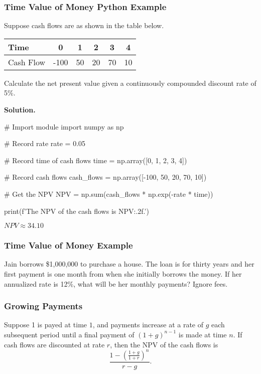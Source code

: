 \documentclass{beamer}
\begin{document}
\begin{frame}[fragile]
\frametitle{Time Value of Money Python Example}
\small
\begin{Example}
Suppose cash flows are as shown in the table below.
\begin{center}
\begin{tabular}{| l | c c c c c |}
\hline
Time			&	0		&	1	&	2	&	3	&	4\\\hline
Cash Flow	&	-100		&	50	&	20	&	70	&	10\\\hline
\end{tabular}
\end{center}
Calculate the net present value given a continuously compounded discount rate of 5\%.
\end{Example}
\begin{multicols}{2}
{
\linespread{0.8}
{\bf\small Solution.}  
{\tiny
\begin{verbatim*}
# Import module
import numpy as np

# Record rate
rate = 0.05

# Record time of cash flows
time = np.array([0, 1, 2, 3, 4])

# Record cash flows
cash_flows = np.array([-100, 50, 20, 70, 10])

# Get the NPV
NPV = np.sum(cash_flows * np.exp(-rate * time))

print(f'The NPV of the cash flows is {NPV:.2f}.')
\end{verbatim*}
}}

$NPV \approx 34.10$
\end{multicols}
\end{frame}


\begin{frame}[t]
\frametitle{Time Value of Money Example}
\small
\begin{Example}
Jain borrows \$1,000,000 to purchase a house. The loan is for thirty years and her first payment is one month from when she initially borrows the money. If her annualized rate is 12\%, what will be her monthly payments? Ignore fees.
\end{Example}

\end{frame}

\begin{frame}
\frametitle{Growing Payments}
Suppose 1 is payed at time $1$, and payments increase at a rate of $g$ each subsequent period until a final payment of $(1 + g)^{n -1}$ is made at time $n$. If cash flows are discounted at rate $r$, then the NPV of the cash flows is
$$
\frac{1 - \left(\frac{1 + g}{1 + r}\right)^n}{r - g}.
$$
\end{frame}
\end{document}

